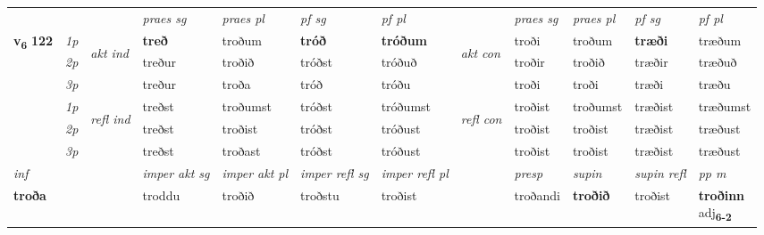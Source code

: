 \begin{longtable}[l]{X>{\footnotesize\itshape}llXXXXlXXXX}
 & &   & \textit{praes sg}  & \textit{praes pl}    & \textit{ pf sg} & \textit{pf pl} & & \textit{praes sg}  & \textit{praes pl}    & \textit{pf sg} & \textit{pf pl }  \\ \cmidrule{4-7} \cmidrule{9-12}
 \multirow{2}{*}{{{\textbf{v{\textsubscript{6}}} \Large{\textbf{122}}}}}  & 1p & \multirow{3}{*}{\begin{turn}{90}\textit{akt ind}\end{turn}} & \textbf{treð} & troðum & \textbf{tróð} & \textbf{tróðum} & \multirow{3}{*}{\begin{turn}{90}\textit{akt con}\end{turn}} &troði & troðum & \textbf{træði} & træðum\\*
 & 2p &  &  treður  & troðið & tróðst & tróðuð & & troðir & troðið & træðir & træðuð \\*
 & 3p &  & treður & troða & tróð & tróðu & & troði & troði& træði & træðu \\*
\cmidrule{4-7} \cmidrule{9-12}
 & 1p & \multirow{3}{*}{\begin{turn}{90}\textit{refl ind}\end{turn}}  & treðst & troðumst & tróðst & tróðumst & \multirow{3}{*}{\begin{turn}{90}\textit{refl con}\end{turn}}  &troðist & troðumst & træðist & træðumst \\*
 & 2p &  & treðst & troðist & tróðst & tróðust & &troðist & troðist & træðist & træðust \\*
 & 3p  & & treðst & troðast & tróðst & tróðust & & troðist & troðist& træðist & træðust \\*
\cmidrule{4-7} \cmidrule{9-12}

   {\textit{inf}} & &  & \textit{imper akt sg} & \textit{imper akt pl} & \textit{imper refl sg} & \textit{imper refl pl} && \textit{presp} & \textit{supin} & \textit{supin refl} & \textit{pp m} \\*
  {\textbf{troða}} & && troddu  & troðið & troðstu & troðist && troðandi &  \textbf{troðið} & troðist & \specialcell{\textbf{troðinn} \\ adj\textbf{\textsubscript{6-2}}} \\*

\midrule


\end{longtable}
